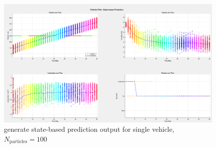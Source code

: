 \begin{figure}[H]
    \centering
    \includegraphics[width= 1\linewidth]{figures/Scenario 1.2.1-3, generate state-based prediction output for single vehicle.png}
    \caption{generate state-based prediction output for single vehicle, $N_\text{particles} = 100$}
    \label{fig: Scenario 1.2.1-3, generate state-based prediction output for single vehicle}
\end{figure}


